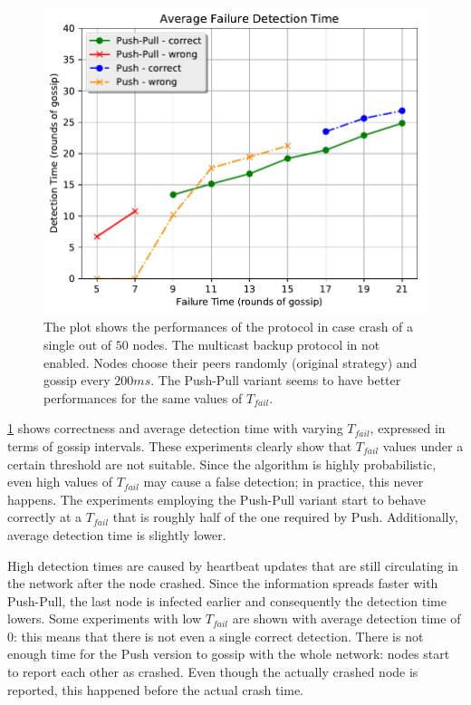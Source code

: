 \begin{figure}[t]
	\centering
	\includegraphics[width=\columnwidth]{figures/n50__average__s0__no_catastrophe__no_multicast}
	\caption{The plot shows the performances of the protocol in case crash of a single out of $50$ nodes. The multicast backup protocol in not enabled. Nodes choose their peers randomly (original strategy) and gossip every $200 \si{ms}$. The Push-Pull variant seems to have better performances for the same values of $T_{fail}$.}
	\label{fig:n50__average__s0__no_catastrophe__no_multicast}
\end{figure}

\cref{fig:n50__average__s0__no_catastrophe__no_multicast} shows correctness and average detection time with varying $T_{fail}$, expressed in terms of gossip intervals.
These experiments clearly show that $T_{fail}$ values under a certain threshold are not suitable.
Since the algorithm is highly probabilistic, even high values of $T_{fail}$ may cause a false detection; in practice, this never happens.
The experiments employing the Push-Pull variant start to behave correctly at a $T_{fail}$ that is roughly half of the one required by Push.
Additionally, average detection time is slightly lower.

High detection times are caused by heartbeat updates that are still circulating in the network after the node crashed.
Since the information spreads faster with Push-Pull, the last node is infected earlier and consequently the detection time lowers.
Some experiments with low $T_{fail}$ are shown with average detection time of 0: this means that there is not even a single correct detection.
There is not enough time for the Push version to gossip with the whole network: nodes start to report each other as crashed.
Even though the actually crashed node is reported, this happened before the actual crash time.


